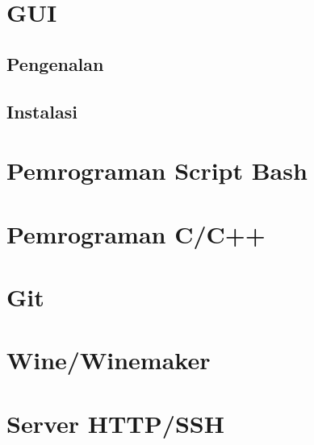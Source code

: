 \documentclass[12pt,]{article}
\begin{document}
	\section{GUI}
	\subsection{Pengenalan}
	\subsection{Instalasi}
	
	\section{Pemrograman Script Bash}
	
	\section{Pemrograman C/C++}
	
	\section{Git}
	
	\section{Wine/Winemaker}
	
	\section{Server HTTP/SSH}
\end{document}
